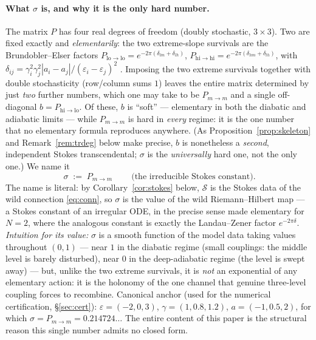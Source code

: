 \documentclass[11pt]{article}
\theoremstyle{definition}
\newcommand{\eps}{\varepsilon}
\newcommand{\Scat}{\mathcal{S}}
\newcommand{\Pmid}{P_{m\to m}}
\begin{document}
\paragraph{What $\sigma$ is, and why it is the only hard number.}
The matrix $P$ has four real degrees of freedom (doubly stochastic, $3\times3$). Two are fixed exactly and
\emph{elementarily}: the two extreme-slope survivals are the Brundobler--Elser factors
$P_{\mathrm{lo}\to\mathrm{lo}}=e^{-2\pi(\delta_{lm}+\delta_{lh})}$,
$P_{\mathrm{hi}\to\mathrm{hi}}=e^{-2\pi(\delta_{hm}+\delta_{lh})}$, with
$\delta_{ij}=\gamma_i^2\gamma_j^2|a_i-a_j|/(\eps_i-\eps_j)^2$ \cite{BE}. Imposing the two extreme survivals
together with double stochasticity (row/column sums $1$) leaves the entire matrix determined by just
\emph{two} further numbers, which one may take to be $\Pmid$ and a single off-diagonal $b=P_{\mathrm{hi}\to
\mathrm{lo}}$. Of these, $b$ is ``soft'' --- elementary in both the diabatic and adiabatic
limits --- while $\Pmid$ is hard in \emph{every} regime: it is the one number that no elementary formula
reproduces anywhere. (As Proposition~\ref{prop:skeleton} and Remark~\ref{rem:trdeg} below make precise, $b$ is
nonetheless a \emph{second}, independent Stokes transcendental; $\sigma$ is the \emph{universally} hard one,
not the only one.) We name it
\begin{equation}\label{eq:sigma}
\boxed{\ \sigma \;:=\; \Pmid\ }\qquad\text{(the irreducible Stokes constant).}
\end{equation}
The name is literal: by Corollary~\ref{cor:stokes} below, $\Scat$ is the Stokes data of the wild connection
\eqref{eq:conn}, so $\sigma$ is the value of the wild Riemann--Hilbert map --- a Stokes constant of an
irregular ODE, in the precise sense made elementary for $N{=}2$, where the analogous constant is exactly the
Landau--Zener factor $e^{-2\pi\delta}$. \emph{Intuition for its value:} $\sigma$ is a smooth function of the
model data taking values throughout $(0,1)$ --- near $1$ in the diabatic regime (small couplings: the middle
level is barely disturbed), near $0$ in the deep-adiabatic regime (the level is swept away) --- but, unlike
the two extreme survivals, it is \emph{not} an exponential of any elementary action: it is the holonomy of the
one channel that genuine three-level coupling forces to recombine. Canonical anchor (used for the numerical
certification, \S\ref{sec:cert}): $\eps=(-2,0,3)$, $\gamma=(1,0.8,1.2)$, $a=(-1,0.5,2)$, for which
$\sigma=\Pmid=0.214724\ldots$ The entire content of this paper is the structural reason this single number
admits no closed form.
\end{document}

